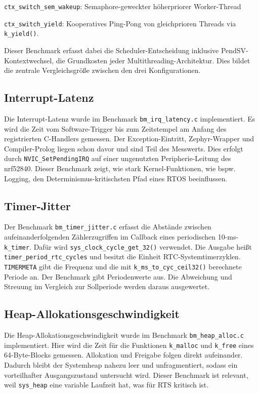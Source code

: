 \lstinline[style=fileinline]|ctx_switch_sem_wakeup|: Semaphore-geweckter höherpriorer Worker-Thread

\lstinline[style=fileinline]|ctx_switch_yield|: Kooperatives Ping-Pong von gleichprioren Threads via \lstinline[style=fileinline]|k_yield()|.

Dieser Benchmark erfasst dabei die Scheduler-Entscheidung inklusive PendSV-Kontextwechsel, die Grundkosten jeder Multithreading-Architektur. Dies bildet die zentrale Vergleichsgröße zwischen den drei Konfigurationen.

\subsection{Interrupt-Latenz}
Die Interrupt-Latenz wurde im Benchmark \lstinline[style=fileinline]|bm_irq_latency.c| implementiert. Es wird die Zeit vom Software-Trigger bis zum Zeitstempel am Anfang des registrierten C-Handlers gemessen. Der Exception-Eintritt, Zephyr-Wrapper und Compiler-Prolog liegen schon davor und sind Teil des Messwerts. Dies erfolgt durch \lstinline[style=fileinline]|NVIC_SetPendingIRQ| auf einer ungenutzten Peripherie-Leitung des nrf52840. Dieser Benchmark zeigt, wie stark Kernel-Funktionen, wie bspw. Logging, den Determinismus-kritischsten Pfad eines RTOS beeinflussen.

\subsection{Timer-Jitter}
Der Benchmark \lstinline[style=fileinline]|bm_timer_jitter.c| erfasst die Abstände zwischen aufeinanderfolgenden Zählerzugriffen im Callback eines periodischen 10-ms-\lstinline[style=fileinline]|k_timer|. Dafür wird \lstinline[style=fileinline]|sys_clock_cycle_get_32()| verwendet. Die Ausgabe heißt \lstinline[style=fileinline]|timer_period_rtc_cycles| und besitzt die Einheit RTC-Systemtimerzyklen. \lstinline[style=fileinline]|TIMERMETA| gibt die Frequenz und die mit \lstinline[style=fileinline]|k_ms_to_cyc_ceil32()| berechnete Periode an. Der Benchmark gibt Periodenwerte aus. Die Abweichung und Streuung im Vergleich zur Sollperiode werden daraus ausgewertet.

\subsection{Heap-Allokationsgeschwindigkeit}
Die Heap-Allokationsgeschwindigkeit wurde im Benchmark \lstinline[style=fileinline]|bm_heap_alloc.c| implementiert. Hier wird die Zeit für die Funktionen \lstinline[style=fileinline]|k_malloc| und \lstinline[style=fileinline]|k_free| eines 64-Byte-Blocks gemessen. Allokation und Freigabe folgen direkt aufeinander. Dadurch bleibt der Systemheap nahezu leer und unfragmentiert, sodass ein vorteilhafter Ausgangszustand untersucht wird. Dieser Benchmark ist relevant, weil \lstinline[style=fileinline]|sys_heap| eine variable Laufzeit hat, was für RTS kritisch ist.

